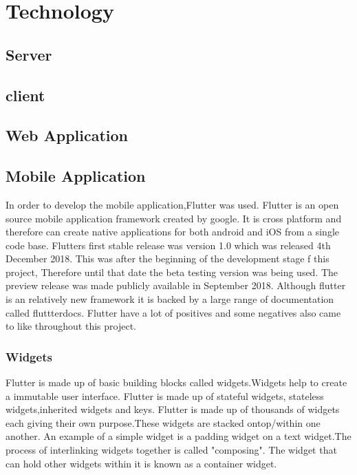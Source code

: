 \section{Technology}
\subsection{Server}

\subsection{client}
\subsection{Web Application}

\subsection{Mobile Application}
In order to develop the mobile application,Flutter was used. Flutter is an open source mobile application framework created by google. It is cross platform and therefore can create native applications for both android and iOS from a single code base. Flutters first stable release was version 1.0 which was released 4th December 2018. This was after the beginning of the development stage f this project, Therefore until that date the beta testing version was being used. The preview release was made publicly available in September 2018. Although flutter is an relatively new framework it is backed by a large range of documentation called fluttterdocs. Flutter have a lot of positives and some negatives also came to like throughout this project.

\subsubsection{Widgets}
Flutter is made up of basic building blocks called widgets.Widgets help to create a immutable user interface. Flutter is made up of stateful widgets, stateless widgets,inherited widgets and keys. Flutter is made up of thousands of widgets each giving their own purpose.These widgets are stacked ontop/within one another. An example of a simple widget is a padding widget on a text widget.The process of interlinking widgets together is called "composing". The widget that can hold other widgets within it is known as a container widget.\cite{widgets}

